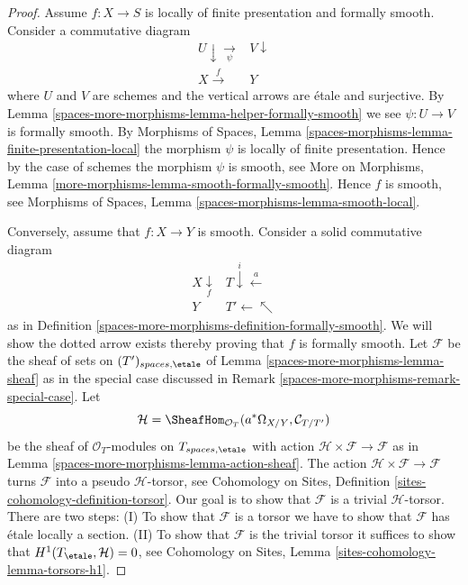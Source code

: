 \begin{proof}
Assume $f : X \to S$ is locally of finite presentation and formally smooth.
Consider a commutative diagram
$$
\begin{array}{cc}U \downarrow\underset{\psi}{\longrightarrow} & V \downarrow \\ X \overset{f}{\longrightarrow} & Y\end{array}
$$
where $U$ and $V$ are schemes and the vertical arrows are \'etale and
surjective. By
Lemma \ref{spaces-more-morphisms-lemma-helper-formally-smooth}
we see $\psi : U \to V$ is formally smooth. By
Morphisms of Spaces, Lemma
\ref{spaces-morphisms-lemma-finite-presentation-local}
the morphism $\psi$ is locally of finite presentation.
Hence by the case of schemes the morphism
$\psi$ is smooth, see
More on Morphisms, Lemma \ref{more-morphisms-lemma-smooth-formally-smooth}.
Hence $f$ is smooth, see
Morphisms of Spaces, Lemma
\ref{spaces-morphisms-lemma-smooth-local}.

\medskip\noindent
Conversely, assume that $f : X \to Y$ is smooth.
Consider a solid commutative diagram
$$
\begin{array}{cc}X \underset{f}{\downarrow} & T \overset{i}{\downarrow}\overset{a}{\longleftarrow} \\ Y & T' \longleftarrow\nwarrow\end{array}
$$
as in Definition \ref{spaces-more-morphisms-definition-formally-smooth}. We will show the
dotted arrow exists thereby proving that $f$ is formally smooth.
Let $\mathcal{F}$ be the sheaf of sets on $(T')_{spaces, \etale}$ of
Lemma \ref{spaces-more-morphisms-lemma-sheaf} as in the special case discussed in
Remark \ref{spaces-more-morphisms-remark-special-case}. Let
$$
\mathcal{H} =
\SheafHom_{\mathcal{O}_T}(a^*\Omega_{X/Y}, \mathcal{C}_{T/T'})
$$
be the sheaf of $\mathcal{O}_T$-modules on $T_{spaces, \etale}$
with action $\mathcal{H} \times \mathcal{F} \to \mathcal{F}$
as in Lemma \ref{spaces-more-morphisms-lemma-action-sheaf}.
The action $\mathcal{H} \times \mathcal{F} \to \mathcal{F}$
turns $\mathcal{F}$ into a pseudo $\mathcal{H}$-torsor, see
Cohomology on Sites, Definition \ref{sites-cohomology-definition-torsor}.
Our goal is to show that $\mathcal{F}$ is a trivial $\mathcal{H}$-torsor.
There are two steps: (I) To show that $\mathcal{F}$ is a torsor
we have to show that $\mathcal{F}$ has \'etale locally a
section. (II) To show that $\mathcal{F}$ is the trivial torsor
it suffices to show that $H^1(T_\etale, \mathcal{H}) = 0$, see
Cohomology on Sites, Lemma \ref{sites-cohomology-lemma-torsors-h1}.


\end{proof}
